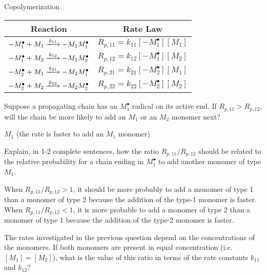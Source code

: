 \begin{activity}{Copolymerization}
\begin{model}
	\begin{center}
		\renewcommand{\arraystretch}{1.8}
		\begin{tabular}{|c|c|}
			\hline
			\textbf{Reaction} & \textbf{Rate Law} \\\hline
			$-M_1^\bullet + M_1 \xlongrightarrow{k_{11}} -M_1M_1^\bullet$ & $R_{p,11} = k_{11}[-M_1^\bullet][M_1]$ \\\hline
			$-M_1^\bullet + M_2 \xlongrightarrow{k_{12}} -M_1M_2^\bullet$ & $R_{p,12} = k_{12}[-M_1^\bullet][M_2]$ \\\hline
			$-M_2^\bullet + M_1 \xlongrightarrow{k_{21}} -M_2M_1^\bullet$ & $R_{p,21} = k_{21}[-M_2^\bullet][M_1]$ \\\hline
			$-M_2^\bullet + M_2 \xlongrightarrow{k_{22}} -M_2M_2^\bullet$ & $R_{p,22} = k_{22}[-M_2^\bullet][M_2]$ \\\hline
		\end{tabular}
	\end{center}

\end{model}

\begin{ctqs}

	\question Suppose a propagating chain has an $M_1^\bullet$ radical on its active end.  If $R_{p,11}>R_{p,12}$, will the chain be more likely to add an $M_1$ or an $M_2$ monomer next?
	
		\begin{solution}[0.5in]
			$M_1$ (the rate is faster to add an $M_1$ monomer)
		\end{solution}
	
	\question Explain, in 1-2 complete sentences, how the ratio $R_{p,11}/R_{p,12}$ should be related to the relative probability for a chain ending in $M_1^\bullet$ to add another monomer of type $M_1$.
	
		\begin{solution}[1in]
			When $R_{p,11}/R_{p,12} > 1$, it should be more probably to add a monomer of type 1 than a monomer of type 2 because the addition of the type-1 monomer is faster.  When $R_{p,11}/R_{p,12}< 1$, it is more probable to add a monomer of type 2 than a monomer of type 1 because the addition of the type-2 monomer is faster.
		\end{solution}
	
	\question The rates investigated in the previous question depend on the concentrations of the monomers.  If both monomers are present in equal concentration (i.e. $[M_1]=[M_2]$), what is the value of this ratio in terms of the rate constants $k_{11}$ and $k_{12}$?
	

\end{ctqs}
\end{activity}
